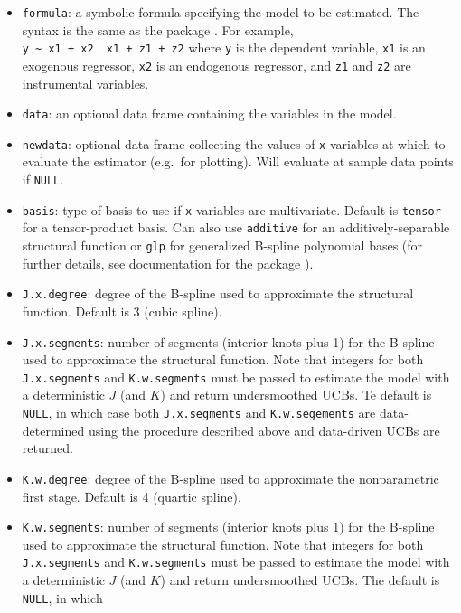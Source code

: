 \documentclass[
]{jss}
\begin{document}
\begin{itemize}
\item
  \texttt{formula}: a symbolic formula specifying the model to be
  estimated. The syntax is the same as the package 
  \citep{IVREG}. For example,
  \texttt{y\ \textasciitilde{}\ x1\ +\ x2\ \textbar{}\ x1\ +\ z1\ +\ z2}
  where \texttt{y} is the dependent variable, \texttt{x1} is an
  exogenous regressor, \texttt{x2} is an endogenous regressor, and
  \texttt{z1} and \texttt{z2} are instrumental variables.
\item
  \texttt{data}: an optional data frame containing the variables in the
  model.
\item
  \texttt{newdata}: optional data frame collecting the values of
  \texttt{x} variables at which to evaluate the estimator (e.g.~for
  plotting). Will evaluate at sample data points if \texttt{NULL}.
\item
  \texttt{basis}: type of basis to use if \texttt{x} variables are
  multivariate. Default is \texttt{tensor} for a tensor-product basis.
  Can also use \texttt{additive} for an additively-separable structural
  function or \texttt{glp} for generalized B-spline polynomial bases
  (for further details, see documentation for the package 
  \citep{CRS}).
\item
  \texttt{J.x.degree}: degree of the B-spline used to approximate the
  structural function. Default is 3 (cubic spline).
\item
  \texttt{J.x.segments}: number of segments (interior knots plus 1) for
  the B-spline used to approximate the structural function. Note that
  integers for both \texttt{J.x.segments} and \texttt{K.w.segments} must
  be passed to estimate the model with a deterministic \(J\) (and \(K\))
  and return undersmoothed UCBs. Te default is \texttt{NULL}, in which
  case both \texttt{J.x.segments} and \texttt{K.w.segements} are
  data-determined using the procedure described above and data-driven
  UCBs are returned.
\item
  \texttt{K.w.degree}: degree of the B-spline used to approximate the
  nonparametric first stage. Default is 4 (quartic spline).
\item
  \texttt{K.w.segments}: number of segments (interior knots plus 1) for
  the B-spline used to approximate the structural function. Note that
  integers for both \texttt{J.x.segments} and \texttt{K.w.segments} must
  be passed to estimate the model with a deterministic \(J\) (and \(K\))
  and return undersmoothed UCBs. The default is \texttt{NULL}, in which

\end{itemize}
\end{document}
